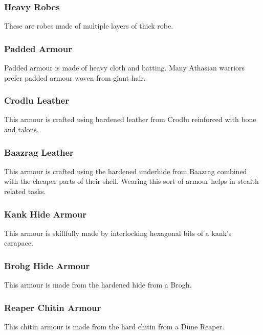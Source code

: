 \begin{multicols}{2}

\subsubsection{Heavy Robes}
\label{itmamr:heavyrobes}
These are robes made of multiple layers of thick robe.

\subsubsection{Padded Armour}
\label{itmamr:padded}
Padded armour is made of heavy cloth and batting. Many Athasian warriors prefer padded armour woven from giant hair.

\subsubsection{Crodlu Leather}
\label{itmamr:crodluleather}
This armour is crafted using hardened leather from Crodlu reinforced with bone and talons.

\subsubsection{Baazrag Leather}
\label{itmamr:baazragleather}
This armour is crafted using the hardened underhide from Baazrag combined with the cheaper parts of their shell. 
Wearing this sort of armour helps in stealth related tasks.

\subsubsection{Kank Hide Armour}
\label{itmamr:kankhide}
This armour is skillfully made by interlocking hexagonal bits of a kank’s carapace.

\subsubsection{Brohg Hide Armour}
\label{itmamr:brohghide}
This armour is made from the hardened hide from a Brogh.

\subsubsection{Reaper Chitin Armour}
\label{itmamr:reaperchitin}
This chitin armour is made from the hard chitin from a Dune Reaper.



\end{multicols}
